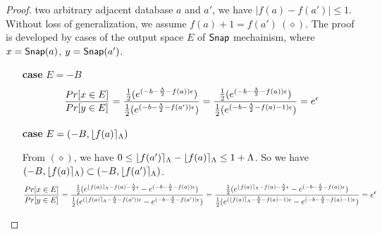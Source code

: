 \documentclass[a4paper,11pt]{article}
\begin{document}
\begin{proof}
%
%
%
%
%
two arbitrary adjacent database $a$ and $a'$, we have $|f(a) - f(a')| \leq 1$. Without loss of generalization, we assume $f(a) + 1 = f(a') ~ (\diamond)$. The proof is developed by cases of the output space $E$ of $\mathsf{Snap}$ mechainism, where $x = \mathsf{Snap}(a)$, $y = \mathsf{Snap}(a')$.

\begin{itemize}
	\item[\textbf{case}] $E = -B$
	\[
	\frac{Pr[x \in E]}{Pr[y \in E]} 
	= \frac{\frac{1}{2}(
				e^{(-b -\frac{\Lambda}{2} - f(a))\epsilon})}
				{\frac{1}{2}(
				e^{(-b -\frac{\Lambda}{2} - f(a'))\epsilon})} \\
	= \frac{\frac{1}{2}(
				e^{(-b -\frac{\Lambda}{2} - f(a))\epsilon})}
				{\frac{1}{2}(
				e^{(-b -\frac{\Lambda}{2} - f(a) - 1)\epsilon})} \\
	= e^{\epsilon}
	\]


	\item[\textbf{case}] $E = (-B, \lfloor f(a) \rceil_{\Lambda})$

	From $(\diamond)$, we have $0 \leq \lfloor f(a') \rceil_{\Lambda} - \lfloor f(a) \rceil_{\Lambda} \leq 1 + \Lambda$.
	So we have $(-B, \lfloor f(a) \rceil_{\Lambda}) \subset (-B, \lfloor f(a') \rceil_{\Lambda})$.
	\[
	\frac{Pr[x \in E]}{Pr[y \in E]} 
	= \frac{\frac{1}{2}(
				e^{\lfloor f(a) \rceil_{\Lambda} - f(a) -\frac{\Lambda}{2}\epsilon}
				- e^{(-b -\frac{\Lambda}{2} - f(a))\epsilon})}
				{\frac{1}{2}(
				e^{(\lfloor f(a) \rceil_{\Lambda} -\frac{\Lambda}{2} - f(a'))\epsilon}
				- e^{(-b -\frac{\Lambda}{2} - f(a'))\epsilon})} \\
	= \frac{\frac{1}{2}(
				e^{\lfloor f(a) \rceil_{\Lambda} - f(a) -\frac{\Lambda}{2}\epsilon}
				- e^{(-b -\frac{\Lambda}{2} - f(a))\epsilon})}
				{\frac{1}{2}(
				e^{(\lfloor f(a) \rceil_{\Lambda} -\frac{\Lambda}{2} - f(a) - 1)\epsilon}
				- e^{(-b -\frac{\Lambda}{2} - f(a) - 1)\epsilon})} \\
	= e^{\epsilon}
	\]


\end{itemize}
\end{proof}
\end{document}
